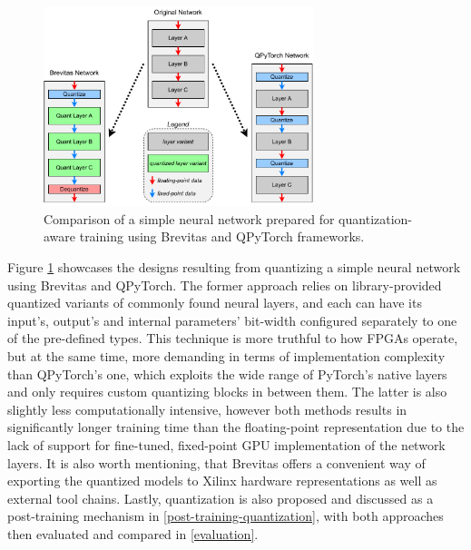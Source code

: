 \begin{figure}[hpt!]
  \centering
  \includegraphics[trim={0cm 0cm 0cm 0cm}, width=0.7\textwidth, center]{models/pre-training-quantization.pdf}
  \caption{Comparison of a simple neural network prepared for quantization-aware training using Brevitas and QPyTorch frameworks.}
  \label{fig:pre-training-quantization}
\end{figure}

Figure \ref{fig:pre-training-quantization} showcases the designs resulting from quantizing a simple neural network using Brevitas and QPyTorch. The former approach relies on library-provided quantized variants of commonly found neural layers, and each can have its input's, output's and internal parameters' bit-width configured separately to one of the pre-defined types. This technique is more truthful to how FPGAs operate, but at the same time, more demanding in terms of implementation complexity than QPyTorch's one, which exploits the wide range of PyTorch's native layers and only requires custom quantizing blocks in between them. The latter is also slightly less computationally intensive, however both methods results in significantly longer training time than the floating-point representation due to the lack of support for fine-tuned, fixed-point GPU implementation of the network layers. It is also worth mentioning, that Brevitas offers a convenient way of exporting the quantized models to Xilinx hardware representations as well as external tool chains. Lastly, quantization is also proposed and discussed as a post-training mechanism in \cref{post-training-quantization}, with both approaches then evaluated and compared in \cref{evaluation}.
